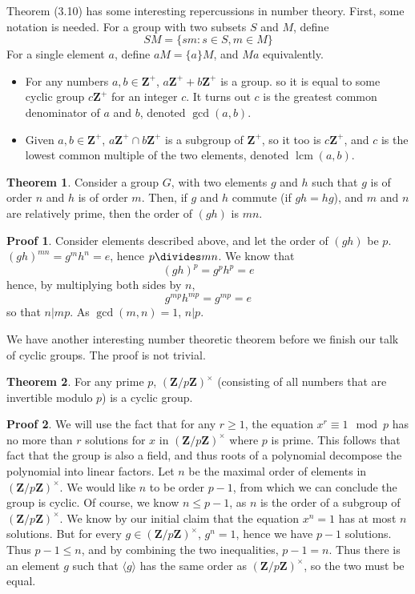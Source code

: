 \documentclass[12pt]{amsbook}
\theoremstyle{definition}
\newtheorem{theorem}{Theorem}[chapter]
\newtheorem*{prf}{Proof}
\newcommand{\lcm}{\operatorname{lcm}} %
\newcommand{\bint}{\mathbf{Z}} %
\newcommand{\gen}[1]{\langle #1 \rangle} %
\begin{document}
Theorem (3.10) has some interesting repercussions in number theory. First, some notation is needed. For a group with two subsets $S$ and $M$, define
%
\[ SM = \{ sm : s \in S, m \in M \} \]
%
For a single element $a$, define $aM = \{ a \}M$, and $Ma$ equivalently.
\begin{itemize}
    \item For any numbers $a, b \in \bint^+$, $a\bint^+ + b\bint^+$ is a group. so it is equal to some cyclic group $c\bint^+$ for an integer $c$. It turns out $c$ is the greatest common denominator  of $a$ and $b$, denoted $\gcd(a,b)$.
    \item Given $a,b \in \bint^+$, $a\bint^+ \cap b\bint^+$ is a subgroup of $\bint^+$, so it too is $c\bint^+$, and $c$ is the lowest common multiple  of the two elements, denoted $\lcm(a,b)$.
\end{itemize}

\begin{theorem}
    Consider a group $G$, with two elements $g$ and $h$ such that $g$ is of order $n$ and $h$ is of order $m$. Then, if $g$ and $h$ commute (if $gh = hg$), and $m$ and $n$ are relatively prime, then the order of $(gh)$ is $mn$.
\end{theorem}
\begin{prf}
    Consider elements described above, and let the order of $(gh)$ be $p$. $(gh)^{mn} = g^mh^n = e$, hence $p \divides mn$. We know that
    \[ (gh)^p = g^ph^p = e \]
    hence, by multiplying both sides by $n$,
    \[ g^{mp}h^{mp} = g^{mp} = e \]
    so that $n | mp$. As $\gcd(m,n) = 1$, $n | p$.
\end{prf}

We have another interesting number theoretic theorem before we finish our talk of cyclic groups. The proof is not trivial.

\begin{theorem}
    For any prime $p$, $(\bint/p\bint)^\times$ (consisting of all numbers that are invertible modulo $p$) is a cyclic group.
\end{theorem}
\begin{prf}
    We will use the fact that for any $r \geq 1$, the equation $x^r \equiv 1 \mod{p}$ has no more than $r$ solutions for $x$ in $(\bint/p\bint)^\times$ where $p$ is prime. This follows that fact that the group is also a field, and thus roots of a polynomial decompose the polynomial into linear factors. Let $n$ be the maximal order of elements in $(\bint/p\bint)^\times$. We would like $n$ to be order $p-1$, from which we can conclude the group is cyclic. Of course, we know $n \leq p - 1$, as $n$ is the order of a subgroup of $(\bint/p\bint)^\times$. We know by our initial claim that the equation $x^n = 1$ has at most $n$ solutions. But for every $g \in (\bint/p\bint)^\times$, $g^n = 1$, hence we have $p-1$ solutions. Thus $p - 1 \leq n$, and by combining the two inequalities, $p-1 = n$. Thus there is an element $g$ such that $\gen{g}$ has the same order as $(\bint/p\bint)^\times$, so the two must be equal.
\end{prf}
\end{document}
